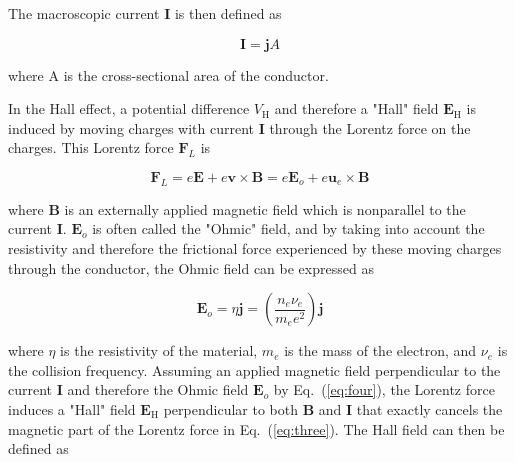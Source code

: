 \documentclass[%
 aip,
rsi,%
 amsmath,amssymb,
 reprint,%
author-numerical,%
]{revtex4-1}
\begin{document}
\noindent The macroscopic current $\boldsymbol { I }$ is then defined as

\begin{equation}
\boldsymbol { I } = \boldsymbol { j } A
\label{eq:two}
\end{equation}

\noindent where A is the cross-sectional area of the conductor. 

\indent In the Hall effect, a potential difference $V _ { \mathrm { H }} $ and therefore a "Hall" field $\boldsymbol { E } _ { \mathrm { H } } $ is induced by moving charges with current $\boldsymbol { I }$ through the Lorentz force on the charges. This Lorentz force $\boldsymbol { F } _ { L }$ is

\begin{equation}
\boldsymbol { F } _ { L } = e \boldsymbol { E } + e \boldsymbol { v } \times \boldsymbol { B } = e \boldsymbol { E } _ { o } + e \boldsymbol { u } _ { e } \times \boldsymbol { B }
\label{eq:three}
\end{equation}

\noindent where $\boldsymbol { B }$ is an externally applied magnetic field which is nonparallel to the current $\boldsymbol { I }$. $\boldsymbol { E } _ { o }$ is often called the "Ohmic" field, and by taking into account the resistivity and therefore the frictional force experienced by these moving charges through the conductor, the Ohmic field can be expressed as 

\begin{equation}
\boldsymbol { E } _ { o } = \eta \boldsymbol { j } = \left( \frac { n _ { e } \nu _ { e } } { m _ { e } e ^ { 2 } } \right) \boldsymbol { j }
\label{eq:four}
\end{equation}

\noindent where $\eta$ is the resistivity of the material, $m _ { e } $ is the mass of the electron, and $\nu _ { e } $ is the collision frequency.
\indent Assuming an applied magnetic field perpendicular to the current $\boldsymbol { I }$ and therefore the Ohmic field $\boldsymbol { E } _ { o }$ by Eq.~(\ref{eq:four}), the Lorentz force induces a "Hall" field $\boldsymbol { E } _ { \mathrm { H } } $ perpendicular to both $\boldsymbol { B }$ and $\boldsymbol { I }$ that exactly cancels the magnetic part of the Lorentz force in Eq.~(\ref{eq:three}). The Hall field can then be defined as 
\end{document}
